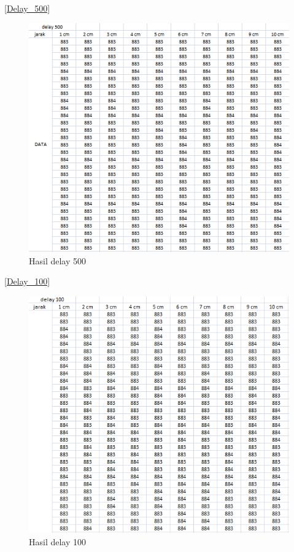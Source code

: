 {\ref{Delay_500}
\begin{figure}[ht]
\centerline{\includegraphics[width=1\textwidth]{figures/delay_500}}
\caption{Hasil delay 500}
\label{Hasil delay 500}
\end{figure}

\ref{Delay_100}
\begin{figure}[ht]
\centerline{\includegraphics[width=1\textwidth]{figures/delay_100_1}}
\caption{Hasil delay 100}
\label{Hasil delay 100}
\end{figure}

}
